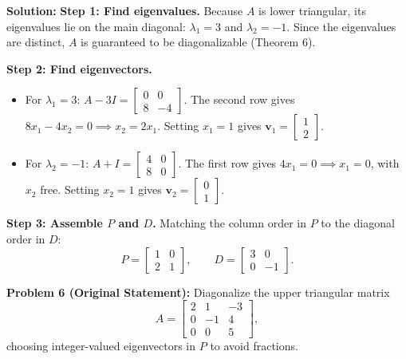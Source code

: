 \documentclass[11pt, letterpaper]{article}
\theoremstyle{definition}
\theoremstyle{remark}
\begin{document}
\textbf{Solution:}
\textbf{Step 1: Find eigenvalues.} Because $A$ is lower triangular, its eigenvalues lie on the main diagonal: $\lambda_{1} = 3$ and $\lambda_{2} = -1$. Since the eigenvalues are distinct, $A$ is guaranteed to be diagonalizable (Theorem 6).

\textbf{Step 2: Find eigenvectors.}
\begin{itemize}
    \item For $\lambda_{1} = 3$: $A - 3I = \begin{bmatrix} 0 & 0 \\ 8 & -4 \end{bmatrix}$. The second row gives $8x_{1} - 4x_{2} = 0 \implies x_{2} = 2x_{1}$. Setting $x_{1} = 1$ gives $\mathbf{v}_{1} = \begin{bmatrix} 1 \\ 2 \end{bmatrix}$.
    \item For $\lambda_{2} = -1$: $A + I = \begin{bmatrix} 4 & 0 \\ 8 & 0 \end{bmatrix}$. The first row gives $4x_{1} = 0 \implies x_{1} = 0$, with $x_{2}$ free. Setting $x_{2} = 1$ gives $\mathbf{v}_{2} = \begin{bmatrix} 0 \\ 1 \end{bmatrix}$.
\end{itemize}
\textbf{Step 3: Assemble $P$ and $D$.} Matching the column order in $P$ to the diagonal order in $D$:
\[
P = \begin{bmatrix} 1 & 0 \\ 2 & 1 \end{bmatrix}, \qquad D = \begin{bmatrix} 3 & 0 \\ 0 & -1 \end{bmatrix}.
\]

\vspace{0.8em}
\textbf{Problem 6 (Original Statement):}
Diagonalize the upper triangular matrix
\[
A = \begin{bmatrix} 2 & 1 & -3 \\ 0 & -1 & 4 \\ 0 & 0 & 5 \end{bmatrix},
\]
choosing integer-valued eigenvectors in $P$ to avoid fractions.
\end{document}

